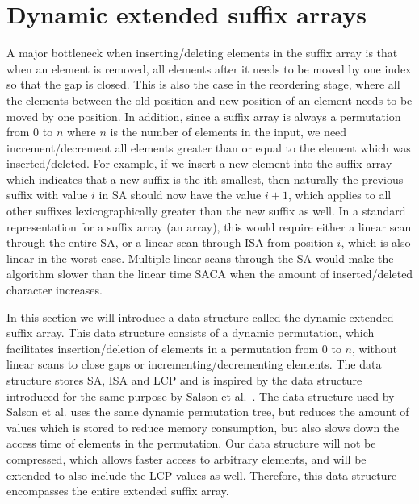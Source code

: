 

\section{Dynamic extended suffix arrays}

A major bottleneck when inserting/deleting elements in the suffix array is that when an
element is removed, all elements after it needs to be moved by one index so that the gap
is closed. This is also the case in the reordering stage, where all the elements between
the old position and new position of an element needs to be moved by one position. In
addition, since a suffix array is always a permutation from $0$ to $n$ where $n$ is the
number of elements in the input, we need increment/decrement all elements greater than or
equal to the element which was inserted/deleted. For example, if we insert a new element
into the suffix array which indicates that a new suffix is the ith smallest, then
naturally the previous suffix with value $i$ in SA should now have the value $i + 1$,
which applies to all other suffixes lexicographically greater than the new suffix as well.
In a standard representation for a suffix array (an array), this would require either a
linear scan through the entire SA, or a linear scan through ISA from position $i$, which
is also linear in the worst case. Multiple linear scans through the SA would make the
algorithm slower than the linear time SACA when the amount of inserted/deleted character
increases. 

In this section we will introduce a data structure called the dynamic extended suffix
array. This data structure consists of a dynamic permutation, which facilitates
insertion/deletion of elements in a permutation from $0$ to $n$, without linear scans to
close gaps or incrementing/decrementing elements. The data structure stores SA, ISA and
LCP and is inspired by the data structure introduced for the same purpose by Salson et
al.~\cite{DynamicExtendedSuffixArrays}. The data structure used by Salson et al. uses the
same dynamic permutation tree, but reduces the amount of values which is stored to reduce
memory consumption, but also slows down the access time of elements in the permutation.
Our data structure will not be compressed, which allows faster access to arbitrary
elements, and will be extended to also include the LCP values as well. Therefore, this
data structure encompasses the entire extended suffix array.

